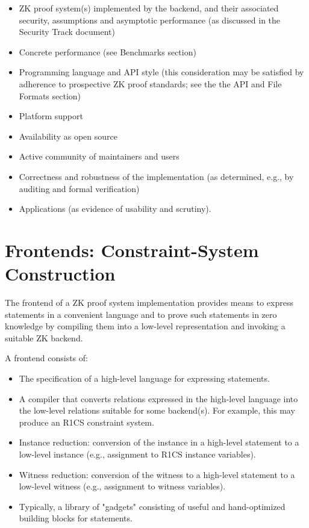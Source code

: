 \begin{itemize}
\item ZK proof system(s) implemented by the backend, and their associated security, assumptions and asymptotic performance (as discussed in the Security Track document)
\item Concrete performance (see Benchmarks section)
\item Programming language and API style (this consideration may be satisfied by adherence to prospective ZK proof standards; see the the API and File Formats section)
\item Platform support
\item Availability as open source
\item Active community of maintainers and users
\item Correctness and robustness of the implementation (as determined, e.g., by auditing and formal verification)
\item Applications (as evidence of usability and scrutiny).
\end{itemize}


\section{Frontends: Constraint-System Construction}
\label{implem:frontends}

The frontend of a ZK proof system implementation provides means to express statements in a convenient language and to prove such statements in zero knowledge by compiling them into a low-level representation and invoking a suitable ZK backend.

A frontend consists of:
\begin{itemize}
\item The specification of a high-level language for expressing statements.
\item A compiler that converts relations expressed in the high-level language into the low-level relations suitable for some backend(s). For example, this may produce an R1CS constraint system.
\item Instance reduction: conversion of the instance in a high-level statement to a low-level instance (e.g., assignment to R1CS instance variables).
\item Witness reduction: conversion of the witness to a high-level statement to a low-level witness (e.g., assignment to witness variables).
\item Typically, a library of "gadgets" consisting of useful and hand-optimized building blocks for statements.
\end{itemize}		

